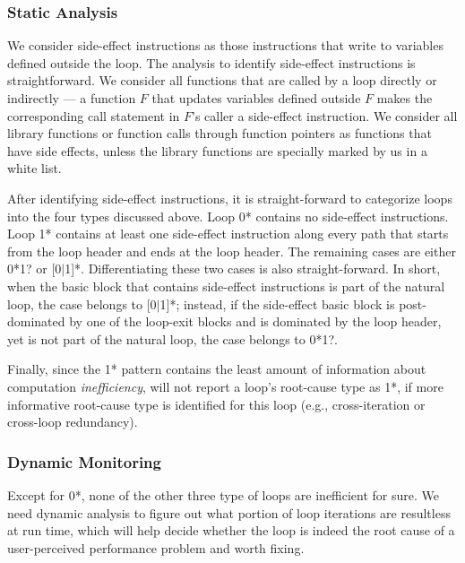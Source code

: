 \subsubsection{Static Analysis}
\label{sec:s_workless}

We consider side-effect instructions as those instructions that write to
variables defined outside the loop. The analysis to identify side-effect
instructions is straightforward. We consider all functions that are called
by a loop directly or indirectly --- a function $F$ that updates variables
defined outside $F$ makes the corresponding call statement in $F$'s
caller a side-effect instruction.
We consider all library functions or function calls through function pointers 
as functions that have side effects, 
unless the library functions are specially marked by us in a white list.

After identifying side-effect instructions, it is straight-forward to
categorize loops into the four types discussed above.
Loop 0* contains no side-effect instructions. 
Loop 1* contains at least one side-effect instruction along every path that
starts from the loop header and ends at the loop header.
The remaining cases are either 
0*1? or [0$|$1]*. 
Differentiating these two cases is also straight-forward.
In short, when the basic block that contains side-effect instructions
is part of the natural loop, the case
belongs to [0$|$1]*; instead, if the side-effect basic block is post-dominated
by one of the loop-exit blocks and is dominated by the loop header, yet is
not part of the natural loop, the case belongs to 0*1?.

Finally, since the 1* pattern contains the least amount of information
about computation \textit{inefficiency}, \Tool will not report a loop's
root-cause type as 1*, if more informative root-cause type is identified 
for this loop (e.g., cross-iteration or cross-loop redundancy).

\subsubsection{Dynamic Monitoring}
\label{sec:d_workless}

Except for 0*, none of the other three type of loops are inefficient for sure.
We need dynamic analysis to figure out what portion of loop iterations are
resultless at run time, which will help decide whether the loop is indeed
the root cause of a user-perceived performance problem and worth fixing.

